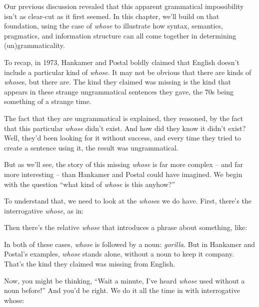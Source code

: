 Our previous discussion revealed that this apparent grammatical impossibility isn't as clear-cut as it first seemed. In this chapter, we'll build on that foundation, using the case of \textit{whose} to illustrate how syntax, semantics, pragmatics, and information structure can all come together in determining (un)grammaticality.

\bigskip

To recap, in 1973, Hankamer and Postal boldly claimed that English doesn't include a particular kind of \textit{whose}. It may not be obvious that there are kinds of \textit{whose}s, but there are. The kind they claimed was missing is the kind that appears in these strange ungrammatical sentences they gave, the 70s being something of a strange time.

\z

The fact that they are ungrammatical is explained, they reasoned, by the fact that this particular \textit{whose} didn't exist. And how did they know it didn't exist? Well, they'd been looking for it without success, and every time they tried to create a sentence using it, the result was ungrammatical.

But as we'll see, the story of this missing \textit{whose} is far more complex -- and far more interesting -- than Hankamer and Postal could have imagined. We begin with the question ``what kind of \textit{whose} is this anyhow?''

To understand that, we need to look at the \textit{whose}s we do have. First, there's the interrogative \textit{whose}, as in:

\z

Then there's the relative \textit{whose} that introduces a phrase about something, like:

\z

In both of these cases, \textit{whose} is followed by a noun: \textit{gorilla}. But in Hankamer and Postal's examples, \textit{whose} stands alone, without a noun to keep it company. That's the kind they claimed was missing from English.

Now, you might be thinking, ``Wait a minute, I've heard \textit{whose} used without a noun before!'' And you'd be right. We do it all the time in with interrogative whose:

